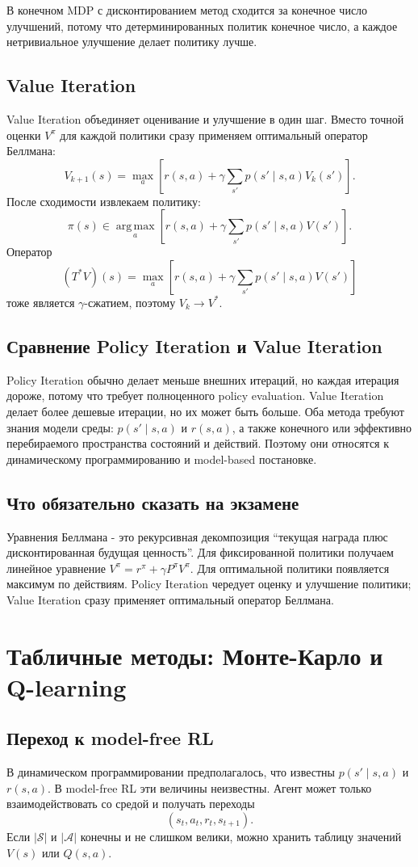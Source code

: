 \documentclass[11pt,a4paper]{article}
\newcommand{\argmax}{\operatorname*{arg\,max}}
\newcommand{\1}{\mathbf{1}}
\newcommand{\cS}{\mathcal S}
\newcommand{\cA}{\mathcal A}
\begin{document}
В конечном MDP с дисконтированием метод сходится за конечное число улучшений, потому что детерминированных политик конечное число, а каждое нетривиальное улучшение делает политику лучше.

\subsection*{Value Iteration}
Value Iteration объединяет оценивание и улучшение в один шаг. Вместо точной оценки $V^\pi$ для каждой политики сразу применяем оптимальный оператор Беллмана:
\[
    V_{k+1}(s)=\max_a\left[r(s,a)+\gamma\sum_{s'}p(s'\mid s,a)V_k(s')\right].
\]
После сходимости извлекаем политику:
\[
    \pi(s)\in\argmax_a\left[r(s,a)+\gamma\sum_{s'}p(s'\mid s,a)V(s')\right].
\]
Оператор
\[
    (T^*V)(s)=\max_a\left[r(s,a)+\gamma\sum_{s'}p(s'\mid s,a)V(s')\right]
\]
тоже является $\gamma$-сжатием, поэтому $V_k\to V^*$.

\subsection*{Сравнение Policy Iteration и Value Iteration}
Policy Iteration обычно делает меньше внешних итераций, но каждая итерация дороже, потому что требует полноценного policy evaluation. Value Iteration делает более дешевые итерации, но их может быть больше. Оба метода требуют знания модели среды: $p(s'\mid s,a)$ и $r(s,a)$, а также конечного или эффективно перебираемого пространства состояний и действий. Поэтому они относятся к динамическому программированию и model-based постановке.

\subsection*{Что обязательно сказать на экзамене}
Уравнения Беллмана - это рекурсивная декомпозиция ``текущая награда плюс дисконтированная будущая ценность''. Для фиксированной политики получаем линейное уравнение $V^\pi=r^\pi+\gamma P^\pi V^\pi$. Для оптимальной политики появляется максимум по действиям. Policy Iteration чередует оценку и улучшение политики; Value Iteration сразу применяет оптимальный оператор Беллмана.

\newpage
\section{Табличные методы: Монте-Карло и Q-learning}

\subsection*{Переход к model-free RL}
В динамическом программировании предполагалось, что известны $p(s'\mid s,a)$ и $r(s,a)$. В model-free RL эти величины неизвестны. Агент может только взаимодействовать со средой и получать переходы
\[
    (s_t,a_t,r_t,s_{t+1}).
\]
Если $|\cS|$ и $|\cA|$ конечны и не слишком велики, можно хранить таблицу значений $V(s)$ или $Q(s,a)$.
\end{document}
